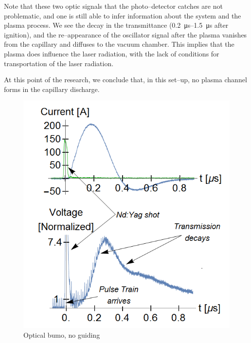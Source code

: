 \documentclass[../main.tex]{subfiles}
\begin{document}
Note that these two optic signals that the photo--detector catches are not problematic, and one is still able to infer information about the system and the plasma process. We see the decay in the transmittance (\SIrange{0.2}{1.5}{\us} after ignition), and the re--appearance of the oscillator signal after the plasma vanishes from the capillary and diffuses to the vacuum chamber. This implies that the plasma does influence the laser radiation, with the lack of conditions for transportation of the laser radiation.

At this point of the research, we conclude that, in this set--up, no plasma channel forms in the capillary discharge.

\begin{figure}
    \centering
    \includegraphics[width=\textwidth]{figures/Curved capillaries/curved-pulsetrain-short.png}
    \caption{Optical bumo, no guiding}
    \label{fig:bump-shortwindow}
\end{figure}
\end{document}

